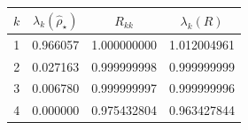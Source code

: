 \begin{tabular}{cccc}
\hline\hline
$k$ & $\lambda_k(\hat\rho_\star)$ & $R_{kk}$ & $\lambda_k(R)$ \\
\hline
1 & 0.966057 & 1.000000000 & 1.012004961 \\
2 & 0.027163 & 0.999999998 & 0.999999999 \\
3 & 0.006780 & 0.999999997 & 0.999999996 \\
4 & 0.000000 & 0.975432804 & 0.963427844 \\
\hline\hline
\end{tabular}
